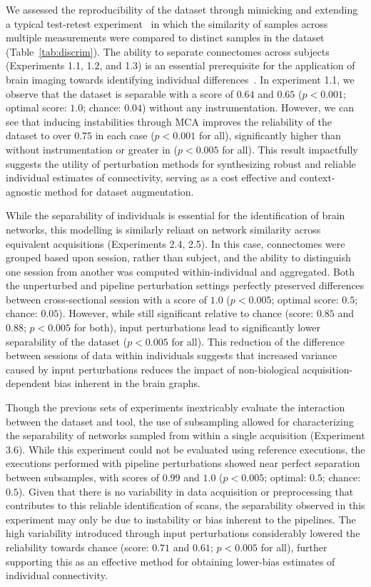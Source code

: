 \documentclass[fleqn,10pt]{SelfArx} %
\begin{document}
We assessed the reproducibility of the dataset through mimicking and extending a typical test-retest
experiment~\cite{bridgeford2020elim} in which the similarity of samples across multiple measurements were
compared to distinct samples in the dataset (Table~\ref{tab:discrim}). The ability to separate connectomes across
subjects (Experiments 1.1, 1.2, and 1.3) is an essential prerequisite for the application of brain imaging towards
identifying individual differences~\cite{Dubois2016-yr}. In experiment 1.1, we observe that the dataset is separable
with a score of $0.64$ and $0.65$ ($p < 0.001$; optimal score: $1.0$; chance: $0.04$) without any instrumentation.
However, we can see that inducing instabilities through MCA improves the reliability of the dataset to over $0.75$ in
each case ($p < 0.001$ for all), significantly higher than without instrumentation or greater in ($p < 0.005$ for all).
This result impactfully suggests the utility of perturbation methods for synthesizing robust and reliable individual
estimates of connectivity, serving as a cost effective and context-agnostic method for dataset augmentation.

While the separability of individuals is essential for the identification of brain networks, this modelling is
similarly reliant on network similarity across equivalent acquisitions (Experiments 2.4, 2.5). In this case,
connectomes were grouped based upon session, rather than subject, and the ability to distinguish one session from
another was computed within-individual and aggregated. Both the unperturbed and pipeline perturbation settings
perfectly preserved differences between cross-sectional session with a score of $1.0$ ($p < 0.005$; optimal score:
$0.5$; chance: $0.05$). However, while still significant relative to chance (score: $0.85$ and $0.88$; $p < 0.005$ for
both), input perturbations lead to significantly lower separability of the dataset ($p < 0.005$ for all). This
reduction of the difference between sessions of data within individuals suggests that increased variance caused by
input perturbations reduces the impact of non-biological acquisition-dependent bias inherent in the brain graphs.

Though the previous sets of experiments inextricably evaluate the interaction between the dataset and tool, the use of
subsampling allowed for characterizing the separability of networks sampled from within a single acquisition
(Experiment 3.6). While this experiment could not be evaluated using reference executions, the executions performed
with pipeline perturbations showed near perfect separation between subsamples, with scores of $0.99$ and $1.0$
($p < 0.005$; optimal: $0.5$; chance: $0.5$). Given that there is no variability in data acquisition or preprocessing
that contributes to this reliable identification of scans, the separability observed in this experiment may only be due
to instability or bias inherent to the pipelines. The high variability introduced through input perturbations
considerably lowered the reliability towards chance (score: $0.71$ and $0.61$; $p < 0.005$ for all), further supporting
this as an effective method for obtaining lower-bias estimates of individual connectivity.
\end{document}
